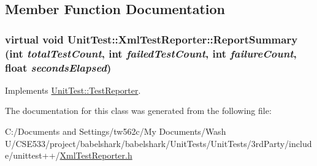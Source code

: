 \subsection{Member Function Documentation}
\hypertarget{class_unit_test_1_1_xml_test_reporter_9fa635aadd426628438e37de16431f5e}{
\subsubsection[{ReportSummary}]{\setlength{\rightskip}{0pt plus 5cm}virtual void UnitTest::XmlTestReporter::ReportSummary (int {\em totalTestCount}, \/  int {\em failedTestCount}, \/  int {\em failureCount}, \/  float {\em secondsElapsed})}}
\label{class_unit_test_1_1_xml_test_reporter_9fa635aadd426628438e37de16431f5e}




Implements \hyperlink{class_unit_test_1_1_test_reporter_8f5010c52b4be55ac4796e24cc669274}{UnitTest::TestReporter}.

The documentation for this class was generated from the following file:\begin{CompactItemize}
\item 
C:/Documents and Settings/tw562c/My Documents/Wash U/CSE533/project/babelshark/babelshark/UnitTests/UnitTests/3rdParty/include/unittest++/\hyperlink{_xml_test_reporter_8h}{XmlTestReporter.h}\end{CompactItemize}
